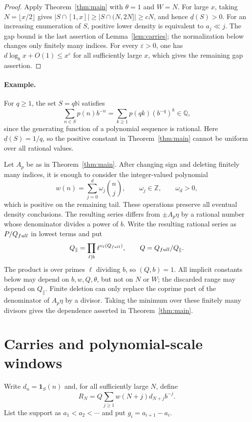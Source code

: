 \documentclass[10pt,a4paper]{amsart}
\newcommand{\N}{\mathbb N}
\newcommand{\Q}{\mathbb Q}
\newcommand{\Z}{\mathbb Z}
\begin{document}
\begin{proof}
Apply Theorem~\ref{thm:main} with $\theta=1$ and $W=N$. For large $x$, taking
$N=\lfloor x/2\rfloor$ gives
$|S\cap[1,x]|\ge|S\cap(N,2N]|\ge cN$, and hence
$\underline d(S)>0$. For an increasing enumeration of $S$, positive lower
density is equivalent to $a_j\ll j$. The gap bound is the last assertion of
Lemma~\ref{lem:carries}; the normalization below changes only finitely many
indices. For every $\varepsilon>0$, one has
$d\log_b x+O(1)\le x^\varepsilon$ for all sufficiently large $x$, which gives
the remaining gap assertion.
\end{proof}

\paragraph{Example.}
For $q\ge1$, the set $S=q\N$ satisfies
\[
 \sum_{n\in S}p(n)b^{-n}
 =\sum_{k\ge1}p(qk)(b^{-q})^k\in\Q,
\]
since the generating function of a polynomial sequence is rational. Here
$\underline d(S)=1/q$, so the positive constant in
Theorem~\ref{thm:main} cannot be uniform over all rational values.

Let $A_p$ be as in Theorem~\ref{thm:main}. After changing sign and deleting
finitely many indices, it is enough to consider the integer-valued polynomial
\[
 w(n)=\sum_{j=0}^d\omega_j\binom nj,\qquad
 \omega_j\in\Z,\qquad \omega_d>0,
\]
which is positive on the remaining tail. These operations preserve all
eventual density conclusions. The resulting series differs from
$\pm A_p\eta$ by a rational number whose denominator divides a power of $b$.
Write the resulting rational series as $P/Q_{\rm full}$ in lowest terms and
put
\[
 Q_{\parallel}=\prod_{\ell\mid b}\ell^{v_\ell(Q_{\rm full})},
 \qquad Q=Q_{\rm full}/Q_{\parallel}.
\]
The product is over primes $\ell$ dividing $b$, so $(Q,b)=1$. All implicit
constants below may depend on $b,w,Q,\theta$, but not on $N$ or $W$; the
discarded range may depend on $Q_{\parallel}$. Finite deletion can only replace
the coprime part of the denominator of $A_p\eta$ by a divisor. Taking the
minimum over these finitely many divisors gives the dependence asserted in
Theorem~\ref{thm:main}.

\section{Carries and polynomial-scale windows}

Write $d_n=\mathbf1_S(n)$ and, for all sufficiently large $N$, define
\[
 R_N=Q\sum_{j\ge1}w(N+j)d_{N+j}b^{-j}.
\]
List the support as $a_1<a_2<\cdots$ and put $g_i=a_{i+1}-a_i$.
\end{document}
